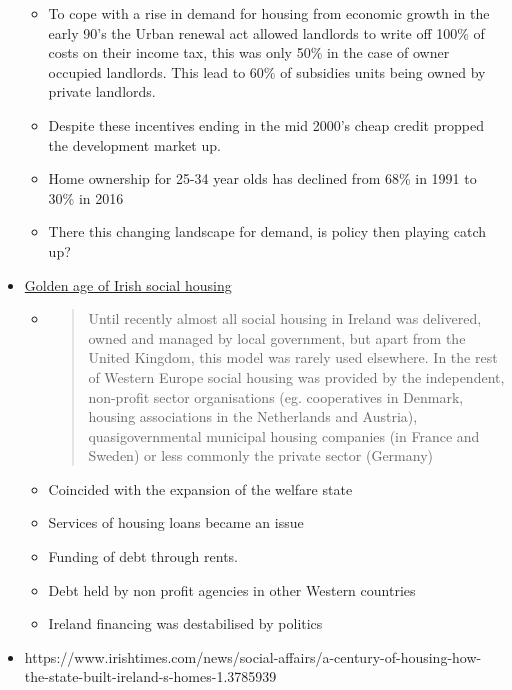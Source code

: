 \documentclass[11pt]{article}
\begin{document}
\begin{itemize}
  \begin{itemize}
  \tightlist
  \item
    To cope with a rise in demand for housing from economic growth in
    the early 90's the Urban renewal act allowed landlords to write off
    100\% of costs on their income tax, this was only 50\% in the case
    of owner occupied landlords. This lead to 60\% of subsidies units
    being owned by private landlords.
  \item
    Despite these incentives ending in the mid 2000's cheap credit
    propped the development market up.
  \item
    Home ownership for 25-34 year olds has declined from 68\% in 1991 to
    30\% in 2016
  \item
    There this changing landscape for demand, is policy then playing
    catch up?
  \end{itemize}
\item
  \href{https://www.ucd.ie/geary/static/publications/workingpapers/gearywp201901.pdf}{Golden
  age of Irish social housing}

  \begin{itemize}
  \item
    \begin{quote}
    Until recently almost all social housing in Ireland was delivered,
    owned and managed by local government, but apart from the United
    Kingdom, this model was rarely used elsewhere. In the rest of
    Western Europe social housing was provided by the independent,
    non-profit sector organisations (eg. cooperatives in Denmark,
    housing associations in the Netherlands and Austria),
    quasigovernmental municipal housing companies (in France and Sweden)
    or less commonly the private sector (Germany)
    \end{quote}
  \item
    Coincided with the expansion of the welfare state
  \item
    Services of housing loans became an issue
  \item
    Funding of debt through rents.
  \item
    Debt held by non profit agencies in other Western countries
  \item
    Ireland financing was destabilised by politics
  \end{itemize}
\item
  https://www.irishtimes.com/news/social-affairs/a-century-of-housing-how-the-state-built-ireland-s-homes-1.3785939
\end{itemize}
\end{document}
